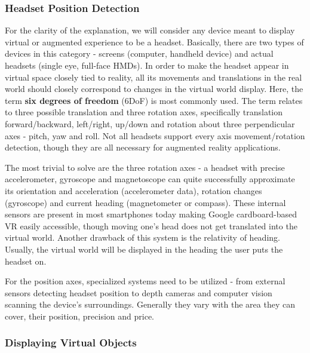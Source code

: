 \documentclass[12pt, a4paper]{article}
\begin{document}
\subsubsection{Headset Position Detection}
For the clarity of the explanation, we will consider any device meant to display virtual or augmented experience to be a headset. Basically, there are two types of devices in this category - screens (computer, handheld device) and actual headsets (single eye, full-face HMDs). In order to make the headset appear in virtual space closely tied to reality, all its movements and translations in the real world should closely correspond to changes in the virtual world display. Here, the term \textbf{six degrees of freedom} (6DoF) is most commonly used. The term relates to three possible translation and three rotation axes, specifically translation forward/backward, left/right, up/down and rotation about three perpendicular axes - pitch, yaw and roll. Not all headsets support every axis movement/rotation detection, though they are all necessary for augmented reality applications.

The most trivial to solve are the three rotation axes - a headset with precise accelerometer, gyroscope and magnetoscope can quite successfully approximate its orientation and acceleration (accelerometer data), rotation changes (gyroscope) and current heading (magnetometer or compass). These internal sensors are present in most smartphones today making Google cardboard-based VR easily accessible, though moving one’s head does not get translated into the virtual world. Another drawback of this system is the relativity of heading. Usually, the virtual world will be displayed in the heading the user puts the headset on.

For the position axes, specialized systems need to be utilized - from external sensors detecting headset position to depth cameras and computer vision scanning the device’s surroundings. Generally they vary with the area they can cover, their position, precision and price.

\subsubsection{Displaying Virtual Objects}
\end{document}
